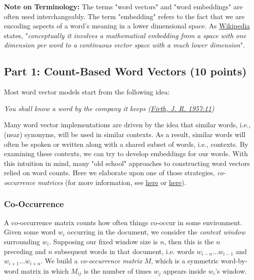 \documentclass[11pt]{article}
\begin{document}
\textbf{Note on Terminology:} The terms "word vectors" and "word
embeddings" are often used interchangeably. The term "embedding" refers
to the fact that we are encoding aspects of a word's meaning in a lower
dimensional space. As
\href{https://en.wikipedia.org/wiki/Word_embedding}{Wikipedia} states,
"\emph{conceptually it involves a mathematical embedding from a space
with one dimension per word to a continuous vector space with a much
lower dimension}".

    \subsection{Part 1: Count-Based Word Vectors (10
points)}\label{part-1-count-based-word-vectors-10-points}

Most word vector models start from the following idea:

\emph{You shall know a word by the company it keeps
(\href{https://en.wikipedia.org/wiki/John_Rupert_Firth}{Firth, J. R.
1957:11})}

Many word vector implementations are driven by the idea that similar
words, i.e., (near) synonyms, will be used in similar contexts. As a
result, similar words will often be spoken or written along with a
shared subset of words, i.e., contexts. By examining these contexts, we
can try to develop embeddings for our words. With this intuition in
mind, many "old school" approaches to constructing word vectors relied
on word counts. Here we elaborate upon one of those strategies,
\emph{co-occurrence matrices} (for more information, see
\href{http://web.stanford.edu/class/cs124/lec/vectorsemantics.video.pdf}{here}
or
\href{https://medium.com/data-science-group-iitr/word-embedding-2d05d270b285}{here}).

    \subsubsection{Co-Occurrence}\label{co-occurrence}

A co-occurrence matrix counts how often things co-occur in some
environment. Given some word \(w_i\) occurring in the document, we
consider the \emph{context window} surrounding \(w_i\). Supposing our
fixed window size is \(n\), then this is the \(n\) preceding and \(n\)
subsequent words in that document, i.e. words \(w_{i-n} \dots w_{i-1}\)
and \(w_{i+1} \dots w_{i+n}\). We build a \emph{co-occurrence matrix}
\(M\), which is a symmetric word-by-word matrix in which \(M_{ij}\) is
the number of times \(w_j\) appears inside \(w_i\)'s window.
\end{document}

